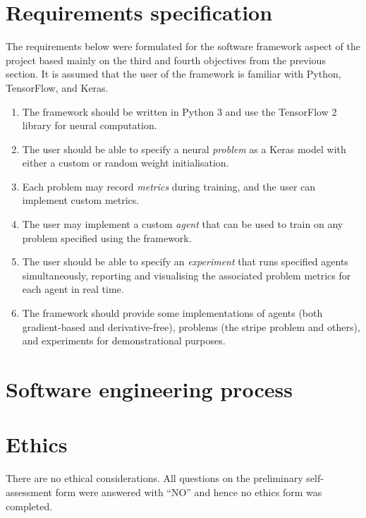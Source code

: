 \section{Requirements specification}
The requirements below were formulated for the software framework aspect of the project based mainly on the third and fourth objectives from the previous section.
It is assumed that the user of the framework is familiar with Python, TensorFlow, and Keras.
\begin{enumerate}
    \item The framework should be written in Python 3 and use the TensorFlow 2 library for neural computation.
    \item The user should be able to specify a neural \textit{problem} as a Keras model with either a custom or random weight initialisation.
    \item Each problem may record \textit{metrics} during training, and the user can implement custom metrics.
    \item The user may implement a custom \textit{agent} that can be used to train on any problem specified using the framework.
    \item The user should be able to specify an \textit{experiment} that runs specified agents simultaneously, reporting and visualising the associated problem metrics for each agent in real time. 
    \item The framework should provide some implementations of agents (both gradient-based and derivative-free), problems (the stripe problem and others), and experiments for demonstrational purposes.
\end{enumerate}

\section{Software engineering process}
\todo

\section{Ethics}
There are no ethical considerations. 
All questions on the preliminary self-assessment form were answered with ``NO'' and hence no ethics form was completed.


